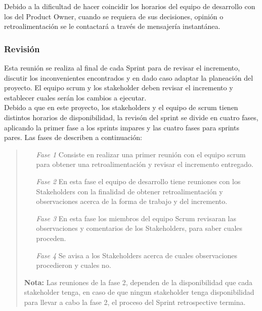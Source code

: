  \noindent Debido a la dificultad de hacer coincidir los horarios del equipo de desarrollo  con los
 del Product Owner, cuando se requiera de sus decisiones, opinión o retroalimentación se le contactará
 a través de mensajería instantánea.
    
\subsubsection{Revisión}

 Esta reunión se realiza al final de cada Sprint para de revisar el incremento, discutir los inconvenientes
 encontrados y en dado caso adaptar la planeación del proyecto. El equipo scrum y los stakeholder deben
 revisar el incremento y establecer cuales serán los cambios a ejecutar.\\

 \noindent Debido a que en este proyecto, los stakeholders y el equipo de scrum tienen distintos horarios
 de disponibilidad, la revisón del sprint se divide en cuatro fases, aplicando la primer fase a los sprints
 impares y las cuatro fases para sprints pares. Las fases de describen a continuación:
 
    \begin{quote}
    \begin{itemize}
    \item[\it Fase 1]
        Consiste en realizar una primer reunión con el equipo scrum para obtener una
        retroalimentación y revisar el incremento entregado.

    \item[\it Fase 2]
        En esta fase el equipo de desarrollo tiene reuniones con los Stakeholders con la
        finalidad de obtener retroalimentación y observaciones acerca de la forma de
        trabajo y del incremento.

    \item[\it Fase 3] 
        En esta fase los miembros del equipo Scrum revisaran las observaciones y
        comentarios de los Stakeholders, para saber cuales proceden.

    \item[\it Fase 4]
        Se avisa a los Stakeholders acerca de cuales observaciones procedieron y cuales no.\\
    \end{itemize}    
    
    {\bf Nota:} Las reuniones de la fase 2, dependen de la disponibilidad que cada stakeholder tenga,
                en caso de que ningun stakeholder tenga disponibilidad para llevar a cabo la fase 2,
                el proceso del Sprint retrospective termina.
    \end{quote}

